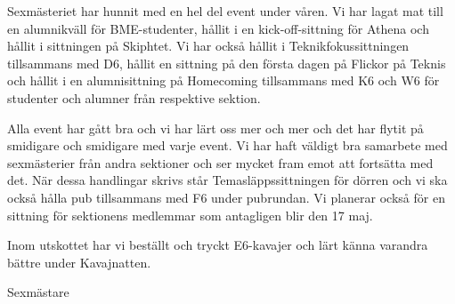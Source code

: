 \documentclass[../_main/handlingar.tex]{subfiles}
\begin{document}
Sexmästeriet har hunnit med en hel del event under våren. Vi har lagat mat till en alumnikväll för BME-studenter, hållit i en kick-off-sittning för Athena och hållit i sittningen på Skiphtet. Vi har också hållit i Teknikfokussittningen tillsammans med D6, hållit en sittning på den första dagen på Flickor på Teknis och hållit i en alumnisittning på Homecoming tillsammans med K6 och W6 för studenter och alumner från respektive sektion.

 Alla event har gått bra och vi har lärt oss mer och mer och det har flytit på smidigare och smidigare med varje event. Vi har haft väldigt bra samarbete med sexmästerier från andra sektioner och ser mycket fram emot att fortsätta med det. När dessa handlingar skrivs står Temasläppssittningen för dörren  och vi ska också hålla pub tillsammans med F6 under pubrundan. Vi planerar också för en sittning för sektionens medlemmar som antagligen blir den 17 maj.

Inom utskottet har vi beställt och tryckt E6-kavajer och lärt känna varandra bättre under Kavajnatten.
\begin{signatures}{1}
    \mvh
    \signature{Linnea Sjödahl}{Sexmästare}
\end{signatures}
\end{document}
